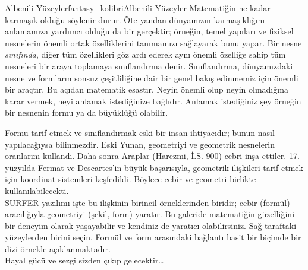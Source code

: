 \begin{surferIntroPage}{Albenili Yüzeyler}{fantasy_kolibri}{Albenili Yüzeyler}
Matematiğin ne kadar karmaşık olduğu söylenir durur. Öte yandan dünyamızın karmaşıklığını anlamamıza yardımcı olduğu da bir gerçektir; örneğin, temel yapıları ve fiziksel nesnelerin önemli ortak özelliklerini tanımamızı sağlayarak bunu yapar.
Bir nesne \textit{sınıfında}, diğer tüm özellikleri göz ardı ederek  aynı önemli özelliğe sahip tüm nesneleri bir araya toplamaya sınıflandırma denir.
Sınıflandırma, dünyamızdaki nesne ve formların sonsuz çeşitliliğine dair bir genel bakış edinmemiz için önemli bir araçtır. Bu açıdan matematik esastır. Neyin önemli olup neyin olmadığına karar vermek, neyi  anlamak istediğinize bağlıdır. Anlamak istediğiniz şey örneğin bir nesnenin formu ya da büyüklüğü olabilir.
\\

\vspace{0.4cm}

Formu tarif etmek ve sınıflandırmak eski bir insan ihtiyacıdır; bunun nasıl yapılacağıysa bilinmezdir.
Eski Yunan, geometriyi ve geometrik nesnelerin oranlarını kullandı.
Daha sonra Araplar (Harezmi, İ.S. 900) cebri inşa ettiler. 17. yüzyılda Fermat ve Descartes'in büyük başarısıyla, geometrik ilişkileri tarif etmek için koordinat sistemleri keşfedildi. Böylece cebir ve geometri birlikte kullanılabilecekti.
\\
\vspace{0.4cm}
SURFER yazılımı işte bu ilişkinin birincil örneklerinden biridir; cebir (formül) aracılığıyla geometriyi (şekil, form) yaratır.
Bu galeride matematiğin güzelliğini bir deneyim olarak yaşayabilir ve kendiniz de yaratıcı olabilirsiniz. Sağ taraftaki yüzeylerden birini seçin. Formül ve form arasındaki bağlantı basit bir biçimde bir dizi örnekle açıklanmaktadır. \\
Hayal gücü ve sezgi sizden çıkıp gelecektir\dots
\end{surferIntroPage}
